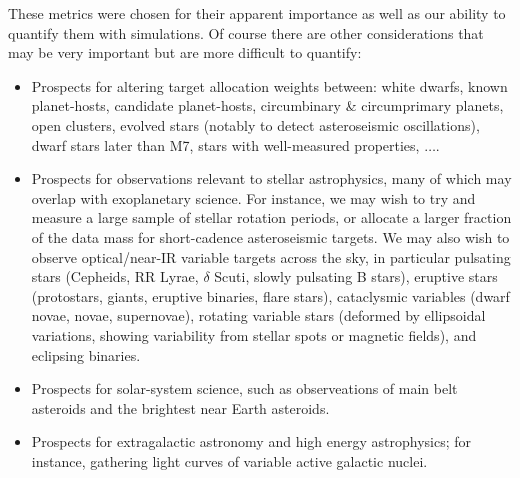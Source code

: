 These metrics were chosen for their apparent importance as well as our
ability to quantify them with simulations. Of course there are other considerations
that may be very important but are more difficult to quantify:
\begin{itemize}
\item Prospects for altering target allocation weights between: white
  dwarfs, known planet-hosts, candidate planet-hosts, circumbinary \&
  circumprimary planets, open clusters, evolved stars (notably to
  detect asteroseismic oscillations), dwarf stars later than M7, stars
  with well-measured properties, $\ldots$.
\item Prospects for observations relevant to stellar astrophysics, many of which may overlap with exoplanetary science.
    For instance, we may wish to try and measure a large sample of stellar rotation periods, or allocate a larger fraction of the data mass for short-cadence asteroseismic targets.
    We may also wish to observe optical/near-IR variable targets across the sky, in particular 
	pulsating stars (Cepheids, RR Lyrae, $\delta$ Scuti, slowly pulsating B 
	stars),
	eruptive stars (protostars, giants, eruptive binaries, flare stars), 
	cataclysmic variables (dwarf novae, novae, supernovae), 
	rotating variable stars (deformed by ellipsoidal variations, showing variability from stellar spots or magnetic fields),
	and eclipsing binaries.
\item Prospects for solar-system science, such as observeations of main belt asteroids and the brightest near Earth asteroids.
\item Prospects for extragalactic astronomy and high energy astrophysics; for instance, gathering light curves of variable active galactic nuclei.
\end{itemize}

